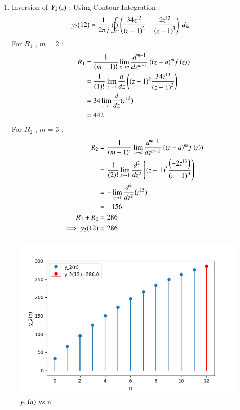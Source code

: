 \documentclass[journal,12pt,onecolumn]{IEEEtran}
\theoremstyle{remark}
\begin{document}
\begin{enumerate}
\begin{enumerate}
    \item
Inversion of $Y_2\left(z\right)$ :
 Using Contour Integration :
\begin{align}
    y_2{(12)}&=\frac{1}{2\pi j}\oint_{C}\left(\frac{34z^{13}}{\left(z-1\right)^2}-
       \frac{2z^{13}}{\left(z-1\right)^3}\right) \;dz 
\end{align}
For $R_1$ , $m=2$ :
\begin{align}
  R_1 &=\frac{1}{\left(m-1\right)!}\lim\limits_{z\to a}\frac{d^{m-1}}{dz^{m-1}}\left({(z-a)}^{m}f\left(z\right)\right)  \\
    &=\frac{1}{\left(1\right)!}\lim\limits_{z\to 1}\frac{d}{dz}\left({(z-1)}^{2}\frac{34z^{13}}{{(z-1)}^2}\right)   \\
    &=34\lim\limits_{z\to 1}\frac{d}{dz}(z^{13})   \\
    &= 442
    \end{align}
   For $R_2$ , $m=3$ :
    \begin{align}
    R_2 &=\frac{1}{\left(m-1\right)!}\lim\limits_{z\to a}\frac{d^{m-1}}{dz^{m-1}}\left({(z-a)}^{m}f\left(z\right)\right)  \\
    &=\frac{1}{\left(2\right)!}\lim\limits_{z\to 1}\frac{d^{2}}{dz^{2}}\left({(z-1)}^{3}\frac{\left(-2z^{13}\right)}{{(z-1)}^3}\right)   \\
    &=-\lim\limits_{z\to 1}\frac{d^2}{dz^2}(z^{13})   \\
    &= -156\\
    R_1 + R_2 &= 286\\
    \implies  y_2{(12)} &= 286
\end{align}

\end{enumerate}



\begin{figure}[!ht]
\centering
  \graphicspath{ {figs/} }
\includegraphics[width=12cm, height=8cm]{graph_2}
\caption{$y_2\left(n\right)$ vs n }
\label{graph:ee25-g3}
\end{figure}


\end{enumerate}
\end{document}
